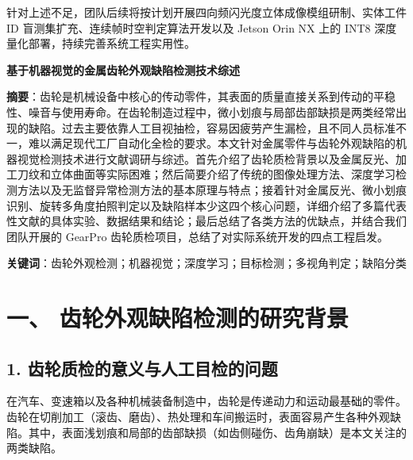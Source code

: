 针对上述不足，团队后续将按计划开展四向频闪光度立体成像模组研制、实体工件 ID 盲测集扩充、连续帧时空判定算法开发以及 Jetson Orin NX 上的 INT8 深度量化部署，持续完善系统工程实用性。




\newpage

\begin{center}
{\bfseries 基于机器视觉的金属齿轮外观缺陷检测技术综述\par}
\end{center}

\textbf{摘要}：齿轮是机械设备中核心的传动零件，其表面的质量直接关系到传动的平稳性、噪音与使用寿命。在齿轮制造过程中，微小划痕与局部齿部缺损是两类经常出现的缺陷。过去主要依靠人工目视抽检，容易因疲劳产生漏检，且不同人员标准不一，难以满足现代工厂自动化全检的要求。本文针对金属零件与齿轮外观缺陷的机器视觉检测技术进行文献调研与综述。首先介绍了齿轮质检背景以及金属反光、加工刀纹和立体曲面等实际困难；然后简要介绍了传统的图像处理方法、深度学习检测方法以及无监督异常检测方法的基本原理与特点；接着针对金属反光、微小划痕识别、旋转多角度拍照判定以及缺陷样本少这四个核心问题，详细介绍了多篇代表性文献的具体实验、数据结果和结论；最后总结了各类方法的优缺点，并结合我们团队开展的 GearPro 齿轮质检项目，总结了对实际系统开发的四点工程启发。

\textbf{关键词}：齿轮外观检测；机器视觉；深度学习；目标检测；多视角判定；缺陷分类


\section*{一、 齿轮外观缺陷检测的研究背景}

\subsection*{1. 齿轮质检的意义与人工目检的问题}
在汽车、变速箱以及各种机械装备制造中，齿轮是传递动力和运动最基础的零件。齿轮在切削加工（滚齿、磨齿）、热处理和车间搬运时，表面容易产生各种外观缺陷。其中，表面浅划痕和局部的齿部缺损（如齿侧碰伤、齿角崩缺）是本文关注的两类缺陷。

